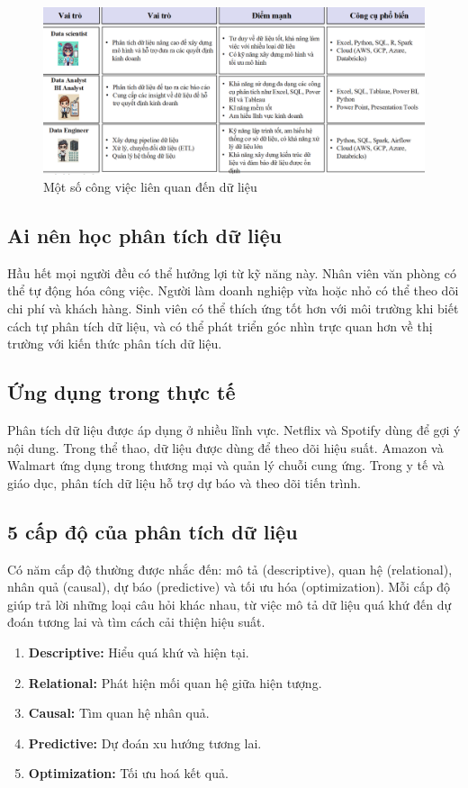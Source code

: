 \documentclass[11pt]{article}
\begin{document}
\begin{figure}[H]
    \centering
    \includegraphics[width=1\linewidth]{images/jobs_in_dataAnalysis.png}
    \caption{Một số công việc liên quan đến dữ liệu}
    \label{fig:jobs_in_dataAnalysis}
\end{figure}


\subsection{Ai nên học phân tích dữ liệu}
Hầu hết mọi người đều có thể hưởng lợi từ kỹ năng này. Nhân viên văn phòng có thể tự động hóa công việc. Người làm doanh nghiệp vừa hoặc nhỏ có thể theo dõi chi phí và khách hàng. Sinh viên có thể thích ứng tốt hơn với môi trường khi biết cách tự phân tích dữ liệu, và có thể phát triển góc nhìn trực quan hơn về thị trường với kiến thức phân tích dữ liệu.

\subsection{Ứng dụng trong thực tế}
Phân tích dữ liệu được áp dụng ở nhiều lĩnh vực. Netflix và Spotify dùng để gợi ý nội dung. Trong thể thao, dữ liệu được dùng để theo dõi hiệu suất. Amazon và Walmart ứng dụng trong thương mại và quản lý chuỗi cung ứng. Trong y tế và giáo dục, phân tích dữ liệu hỗ trợ dự báo và theo dõi tiến trình.


\subsection{5 cấp độ của phân tích dữ liệu}
Có năm cấp độ thường được nhắc đến: mô tả (descriptive), quan hệ (relational), nhân quả (causal), dự báo (predictive) và tối ưu hóa (optimization). Mỗi cấp độ giúp trả lời những loại câu hỏi khác nhau, từ việc mô tả dữ liệu quá khứ đến dự đoán tương lai và tìm cách cải thiện hiệu suất.
\begin{enumerate}
    \item \textbf{Descriptive:} Hiểu quá khứ và hiện tại.
    \item \textbf{Relational:} Phát hiện mối quan hệ giữa hiện tượng.
    \item \textbf{Causal:} Tìm quan hệ nhân quả.
    \item \textbf{Predictive:} Dự đoán xu hướng tương lai.
    \item \textbf{Optimization:} Tối ưu hoá kết quả.
\end{enumerate}
\end{document}
